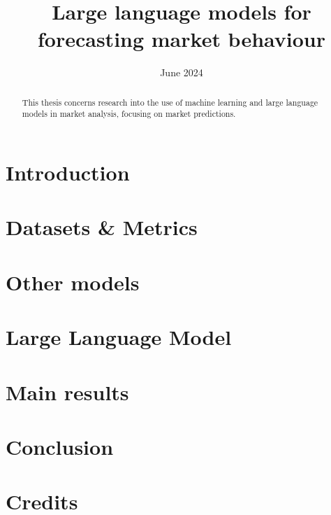 \documentclass[licencjacka, en]{pracamgr}
\title{Large language models for forecasting market behaviour}
\date{June 2024}
\begin{document}
\newcommand{\rozdzial}[2]{
	\chapter{#1}
	\label{chap:#2}
	
}

\maketitle

\begin{abstract}
	This thesis concerns research into the use of machine learning
	and large language models in market analysis, focusing on market
	predictions.
\end{abstract}

\tableofcontents

\rozdzial{Introduction}{introduction}
\rozdzial{Datasets \& Metrics}{preliminary-definitions}
\rozdzial{Other models}{other-models}
\rozdzial{Large Language Model}{large-language-model}
\rozdzial{Main results}{results}
\rozdzial{Conclusion}{conclusion}
\rozdzial{Credits}{credits}
% 

\end{document}
